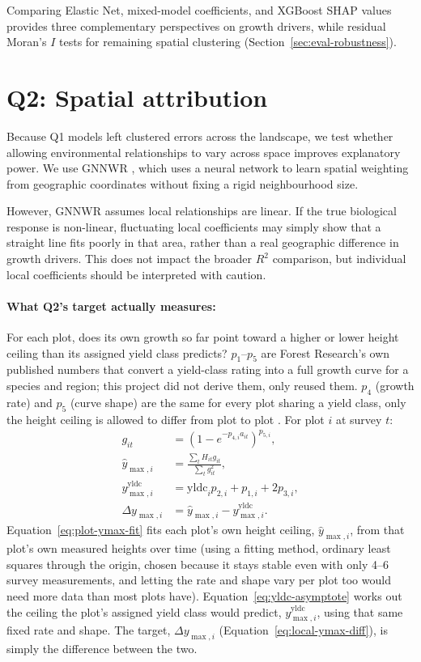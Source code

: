 Comparing Elastic Net, mixed-model coefficients, and XGBoost SHAP values provides three complementary perspectives on growth drivers, while residual Moran's $I$ tests for remaining spatial clustering (Section~\ref{sec:eval-robustness}).


\section{Q2: Spatial attribution}
Because Q1 models left clustered errors across the landscape, we test whether allowing environmental relationships to vary across space improves explanatory power. We use GNNWR \cite{du2020Geographically_C6_GWR}, which uses a neural network to learn spatial weighting from geographic coordinates without fixing a rigid neighbourhood size.

However, GNNWR assumes local relationships are linear. If the true biological response is non-linear, fluctuating local coefficients may simply show that a straight line fits poorly in that area, rather than a real geographic difference in growth drivers. This does not impact the broader $R^2$ comparison, but individual local coefficients should be interpreted with caution.

\paragraph*{What Q2's target actually measures:} For each plot, does its own growth so far point toward a higher or lower height ceiling than its assigned yield class predicts? $p_1$--$p_5$ are Forest Research's own published numbers that convert a yield-class rating into a full growth curve for a species and region; this project did not derive them, only reused them. $p_4$ (growth rate) and $p_5$ (curve shape) are the same for every plot sharing a yield class, only the height ceiling is allowed to differ from plot to plot \cite{scolforo2013Dominant_C2_CR}. For plot $i$ at survey $t$:
\begin{align}
g_{it} &= \left(1-e^{-p_{4,i}a_{it}}\right)^{p_{5,i}}, \label{eq:git-curve} \\
\hat y_{\max,i} &= \frac{\sum_t H_{it}g_{it}}{\sum_t g_{it}^2}, \label{eq:plot-ymax-fit} \\
y_{\max,i}^{\mathrm{yldc}} &= \mathrm{yldc}_i p_{2,i}+p_{1,i}+2p_{3,i}, \label{eq:yldc-asymptote} \\
\Delta y_{\max,i} &= \hat y_{\max,i}-y_{\max,i}^{\mathrm{yldc}}. \label{eq:local-ymax-diff}
\end{align}
Equation~\eqref{eq:plot-ymax-fit} fits each plot's own height ceiling, $\hat y_{\max,i}$, from that plot's own measured heights over time (using a fitting method, ordinary least squares through the origin, chosen because it stays stable even with only 4--6 survey measurements, and letting the rate and shape vary per plot too would need more data than most plots have). Equation~\eqref{eq:yldc-asymptote} works out the ceiling the plot's assigned yield class would predict, $y_{\max,i}^{\mathrm{yldc}}$, using that same fixed rate and shape. The target, $\Delta y_{\max,i}$ (Equation~\eqref{eq:local-ymax-diff}), is simply the difference between the two.

